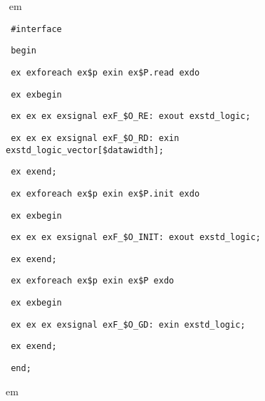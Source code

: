 \documentclass[a4paper,12pt,twoside,english]{article}
\def\s{\hskip 1.15 ex}
\begin{document}
\begin{description}
\item[]
\def\prefskipu{}\def\prefskipo{}\def\prefskipa{}\def\prefskipu{\hskip10pt}\def\prefskipo{\hskip10pt}\def\prefskipa{\hskip20pt}\def\content{
\vskip-5pt{\parindent0pt\parbox{\linewidth}{\tt\smallsize\hskip10pt \#interface}}
\vskip-5pt{\parindent0pt\parbox{\linewidth}{\tt\smallsize\hskip10pt begin}}
\vskip-5pt{\parindent0pt\parbox{\linewidth}{\tt\smallsize\hskip10pt \s \s foreach\s \$p\s in\s \$P.read\s do}}
\vskip-5pt{\parindent0pt\parbox{\linewidth}{\tt\smallsize\hskip10pt \s \s begin}}
\vskip-5pt{\parindent0pt\parbox{\linewidth}{\tt\smallsize\hskip10pt \s \s \s \s signal\s F\_\$O\_RE:\s out\s std\_logic;}}
\vskip-5pt{\parindent0pt\parbox{\linewidth}{\tt\smallsize\hskip10pt \s \s \s \s signal\s F\_\$O\_RD:\s in\s std\_logic\_vector{[}\$datawidth{]};}}
\vskip-5pt{\parindent0pt\parbox{\linewidth}{\tt\smallsize\hskip10pt \s \s end;}}
\vskip-5pt{\parindent0pt\parbox{\linewidth}{\tt\smallsize\hskip10pt \s \s foreach\s \$p\s in\s \$P.init\s do}}
\vskip-5pt{\parindent0pt\parbox{\linewidth}{\tt\smallsize\hskip10pt \s \s begin}}
\vskip-5pt{\parindent0pt\parbox{\linewidth}{\tt\smallsize\hskip10pt \s \s \s \s signal\s F\_\$O\_INIT:\s out\s std\_logic;}}
\vskip-5pt{\parindent0pt\parbox{\linewidth}{\tt\smallsize\hskip10pt \s \s end;}}
\vskip-5pt{\parindent0pt\parbox{\linewidth}{\tt\smallsize\hskip10pt \s \s foreach\s \$p\s in\s \$P\s do}}
\vskip-5pt{\parindent0pt\parbox{\linewidth}{\tt\smallsize\hskip10pt \s \s begin}}
\vskip-5pt{\parindent0pt\parbox{\linewidth}{\tt\smallsize\hskip10pt \s \s \s \s signal\s F\_\$O\_GD:\s in\s std\_logic;}}
\vskip-5pt{\parindent0pt\parbox{\linewidth}{\tt\smallsize\hskip10pt \s \s end;}}
\vskip-5pt{\parindent0pt\parbox{\linewidth}{\tt\smallsize\hskip10pt end;}}
}
$ $
 em
\content
{} em

\end{description}

\vskip5pt



\def\thesubsubsection{\vrule width 0pt height 1.3 ex}
\end{document}
